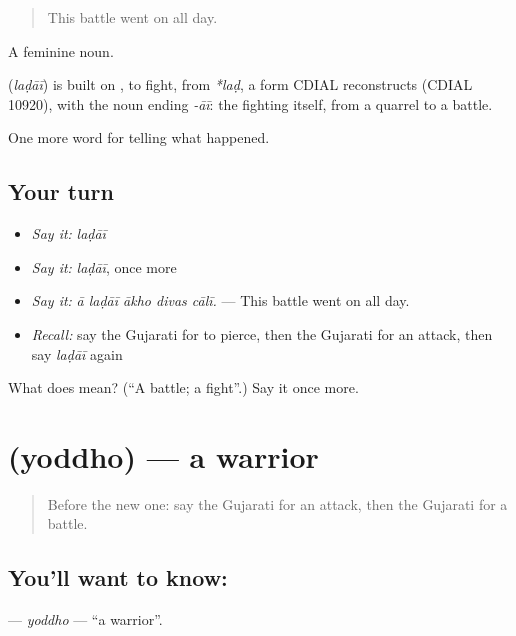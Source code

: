 \begin{quote}
This battle went on all day.
\end{quote}

A feminine noun.

\begin{cousinweb}
\textbf{} (\emph{laḍāī}) is built on \textbf{}, to fight, from \emph{*laḍ}, a form CDIAL reconstructs (CDIAL 10920), with the noun ending \emph{-āī}: the fighting itself, from a quarrel to a battle.
\end{cousinweb}

\begin{grammarlens}[title={What you've built}]
One more word for telling what happened.
\end{grammarlens}

\subsection*{Your turn}
\begin{itemize}
\raggedright
  \item \emph{Say it:} \emph{laḍāī}
  \item \emph{Say it:} \emph{laḍāī}, once more
  \item \emph{Say it:} \emph{ā laḍāī ākho divas cālī.} — This battle went on all day.
  \item \emph{Recall:} say the Gujarati for to pierce, then the Gujarati for an attack, then say \emph{laḍāī} again
\end{itemize}

\begin{tcolorbox}[breakable,colback=teal!4,colframe=teal!35!black,title={Before you move on}]
What does  mean? (\textquotedblleft{}A battle; a fight\textquotedblright{}.) Say it once more.
\end{tcolorbox}
\section[\texorpdfstring{\gu{યોદ્ધો} (yoddho)}{યોદ્ધો (yoddho)}]{ (yoddho) — a warrior}

\label{lesson:GU-C322-yoddho}



\begin{quote}
Before the new one: say the Gujarati for an attack, then the Gujarati for a battle.
\end{quote}

\subsection*{You'll want to know: }
\textbf{} — \emph{yoddho} — \textquotedblleft{}a warrior\textquotedblright{}.

